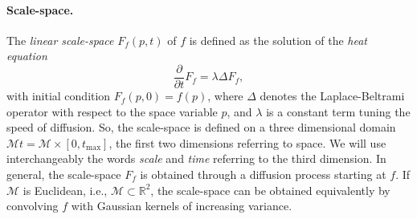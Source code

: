  
\paragraph*{Scale-space.}
The \emph{linear scale-space} $F_f(p,t)$ of $f$ is defined as the solution of the \emph{heat equation} 
\[\frac{\partial}{\partial t} F_f = \lambda \Delta F_f,\]
with initial condition $F_f(p,0)=f(p)$, where $\Delta$ denotes the Laplace-Beltrami operator with respect to the space variable $p$, and $\lambda$ is a constant term tuning the speed of diffusion.
So, the scale-space is defined on a three dimensional domain ${\mathcal M}t={\mathcal M}\times [0,t_{\max}]$, the first two dimensions referring to space. 
We will use interchangeably the words \emph{scale} and \emph{time} referring to the third dimension.
In general, the scale-space $F_f$ is obtained through a diffusion process starting at $f$.
If ${\mathcal M}$ is Euclidean, i.e., ${\mathcal M}\subset\mathbb{R}^2$, the scale-space can be obtained equivalently by convolving $f$ with Gaussian kernels of increasing variance. %

